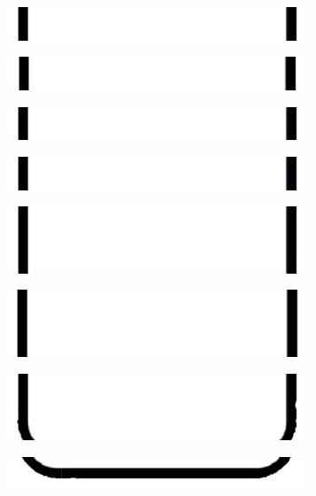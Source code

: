 \documentclass[
]{article}
\begin{document}
\includegraphics[width=3.54722in,height=0.39306in]{vertopal_2361032064654423b71b7db67d98c753/media/image23.png}

\includegraphics[width=3.54722in,height=0.39444in]{vertopal_2361032064654423b71b7db67d98c753/media/image24.png}

\includegraphics[width=3.54722in,height=0.39305in]{vertopal_2361032064654423b71b7db67d98c753/media/image25.png}

\includegraphics[width=3.54722in,height=0.39306in]{vertopal_2361032064654423b71b7db67d98c753/media/image26.png}

\includegraphics[width=3.54722in,height=0.78611in]{vertopal_2361032064654423b71b7db67d98c753/media/image27.png}

\includegraphics[width=3.54722in,height=0.7875in]{vertopal_2361032064654423b71b7db67d98c753/media/image28.png}

\includegraphics[width=3.54722in,height=0.78611in]{vertopal_2361032064654423b71b7db67d98c753/media/image29.png}

\includegraphics[width=3.54722in,height=0.38055in]{vertopal_2361032064654423b71b7db67d98c753/media/image30.png}
\end{document}
